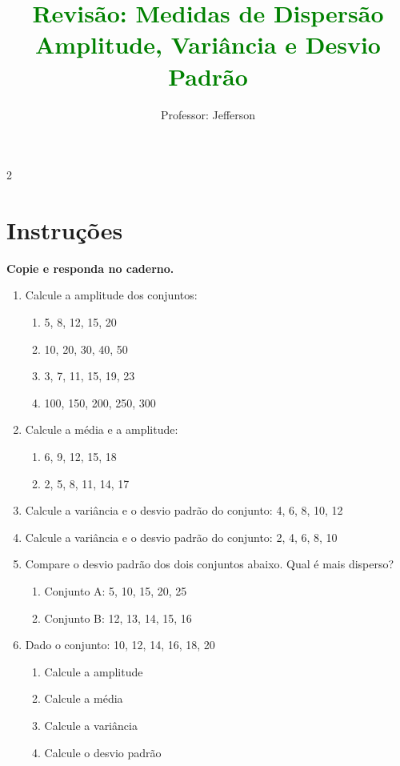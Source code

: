 \documentclass[11pt]{article}
\title{\textcolor{green}{Revisão: Medidas de Dispersão \\
    Amplitude, Variância e Desvio Padrão}}
\author{Professor: Jefferson}
\date{}
\begin{document}
\maketitle
\vspace{-0.8cm}

\begin{multicols}{2}

\section*{Instruções}
\textbf{Copie e responda no caderno.}


\begin{enumerate}[leftmargin=*]

\item Calcule a amplitude dos conjuntos:
\begin{enumerate}[label=\alph*)]
\item 5, 8, 12, 15, 20
\item 10, 20, 30, 40, 50
\item 3, 7, 11, 15, 19, 23
\item 100, 150, 200, 250, 300
\end{enumerate}

\item Calcule a média e a amplitude:
\begin{enumerate}[label=\alph*)]
\item 6, 9, 12, 15, 18
\item 2, 5, 8, 11, 14, 17
\end{enumerate}

\item Calcule a variância e o desvio padrão do conjunto: 4, 6, 8, 10, 12

\item Calcule a variância e o desvio padrão do conjunto: 2, 4, 6, 8, 10

\item Compare o desvio padrão dos dois conjuntos abaixo. Qual é mais disperso?
\begin{enumerate}[label=\alph*)]
\item Conjunto A: 5, 10, 15, 20, 25
\item Conjunto B: 12, 13, 14, 15, 16
\end{enumerate}

\item Dado o conjunto: 10, 12, 14, 16, 18, 20
\begin{enumerate}[label=\alph*)]
\item Calcule a amplitude
\item Calcule a média
\item Calcule a variância
\item Calcule o desvio padrão
\end{enumerate}


\end{enumerate}
\end{multicols}
\end{document}
